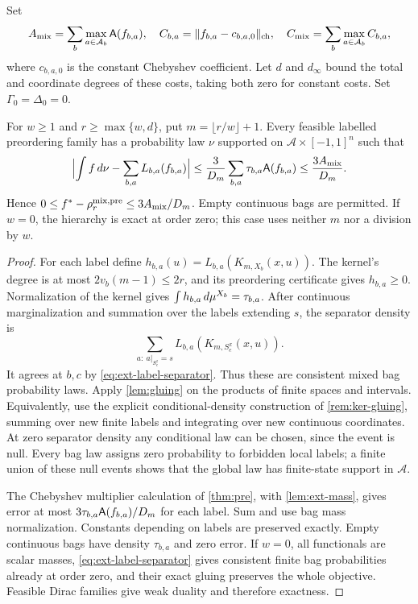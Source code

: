Set
\[
 A_{\mathrm{mix}}=\sum_b\max_{a\in\mathcal A_b}\mathsf{A}(f_{b,a}),\quad
 C_{b,a}=\lVert f_{b,a}-c_{b,a,0}\rVert_{\mathrm{ch}},\quad
 C_{\mathrm{mix}}=\sum_b\max_{a\in\mathcal A_b}C_{b,a},
\]
where $c_{b,a,0}$ is the constant Chebyshev coefficient. Let $d$ and
$d_\infty$ bound the total and coordinate degrees of these costs, taking
both zero for constant costs. Set $\Gamma_0=\Delta_0=0$.

\begin{theorem}\label{thm:finite-state}
For $w\ge1$ and $r\ge\max\{w,d\}$, put
$m=\lfloor r/w\rfloor+1$. Every feasible labelled preordering family has a
probability law $\nu$ supported on $\mathcal A\times[-1,1]^n$ such that
\[
 \Bigl\lvert\int f\,d\nu-\sum_{b,a}L_{b,a}(f_{b,a})\Bigr\rvert
 \le\frac3{D_m}\sum_{b,a}\tau_{b,a}\mathsf{A}(f_{b,a})
 \le\frac{3A_{\mathrm{mix}}}{D_m}.
\]
Hence $0\le f^{*}-\rho_r^{\mathrm{mix,pre}}\le3A_{\mathrm{mix}}/D_m$.
Empty continuous bags are permitted. If $w=0$, the hierarchy is exact at
order zero; this case uses neither $m$ nor a division by $w$.
\end{theorem}
\begin{proof}
For each label define
$h_{b,a}(u)=L_{b,a}(K_{m,X_b}(x,u))$. The kernel's degree is at most
$2v_b(m-1)\le2r$, and its preordering certificate gives $h_{b,a}\ge0$.
Normalization of the kernel gives $\int h_{b,a}\,d\mu^{X_b}=\tau_{b,a}$.
After continuous marginalization and summation over the labels extending
$s$, the separator density is
\begin{equation}\label{eq:ext-pre-separator-density}
 \sum_{a:\ a|_{S_e^z}=s}L_{b,a}(K_{m,S_e^x}(x,u)).
\end{equation}
It agrees at $b,c$ by \eqref{eq:ext-label-separator}. Thus these are
consistent mixed bag probability laws. Apply \cref{lem:gluing} on the
products of finite spaces and intervals. Equivalently, use the explicit
conditional-density construction of \cref{rem:ker-gluing}, summing over
new finite labels and integrating over new continuous coordinates.
At zero separator density any conditional law can be chosen, since the
event is null. Every bag law assigns zero probability to forbidden local
labels; a finite union of these null events shows that the global law has
finite-state support in $\mathcal A$.

The Chebyshev multiplier calculation of \cref{thm:pre}, with
\cref{lem:ext-mass}, gives error at most
$3\tau_{b,a}\mathsf{A}(f_{b,a})/D_m$ for each label. Sum and use bag mass
normalization. Constants depending on labels are preserved exactly. Empty
continuous bags have density $\tau_{b,a}$ and zero error. If $w=0$, all
functionals are scalar masses, \eqref{eq:ext-label-separator} gives
consistent finite bag probabilities already at order zero, and their
exact gluing preserves the whole objective. Feasible Dirac families give
weak duality and therefore exactness.
\end{proof}

